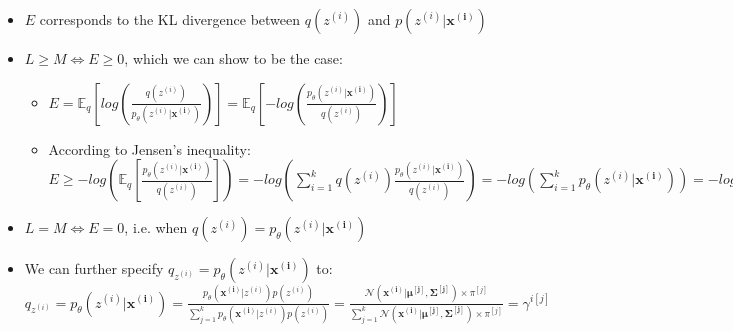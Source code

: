 \begin{itemize}
    Proof 1:
    \begin{itemize}
        \item $\sum_{i=1}^n \sum_{z^{(i)}} q(z^{(i)}) \log \frac{p_\theta( \boldsymbol{x^{(i)}}, z^{(i)})}{q(z^{(i)})} = \sum_{i=1}^n \sum_{z^{(i)}} p_\theta( z^{(i)} |\boldsymbol{x^{(i)}}) \log \frac{p_\theta( \boldsymbol{x^{(i)}}, z^{(i)})}{p_\theta( z^{(i)} |\boldsymbol{x^{(i)}})} = \sum_{i=1}^n \sum_{z^{(i)}} p_\theta( z^{(i)} |\boldsymbol{x^{(i)}}) \log \frac{p_\theta( \boldsymbol{x^{(i)}}) p_\theta( z^{(i)} |\boldsymbol{x^{(i)}})}{p_\theta( z^{(i)} |\boldsymbol{x^{(i)}})} = \sum_{i=1}^n \sum_{z^{(i)}} p_\theta( z^{(i)} |\boldsymbol{x^{(i)}}) \log p_\theta( \boldsymbol{x^{(i)}}) = \sum_{i=1}^n \times 1 \times \log p_\theta( \boldsymbol{x^{(i)}}) = L$
    \end{itemize}
    Proof 2:
    \begin{itemize}
        \item $L = \mathbb{E}_q[log(p_{\theta}(\boldsymbol{x^{(i)}}))] = \mathbb{E}_q[log(\frac{ p_{\theta}(\boldsymbol{x^{(i)}}, z^{(i)}) }{ p_{\theta}(z^{(i)} | \boldsymbol{x^{(i)}}) } \frac{ q(z^{(i)}) }{ q(z^{(i)}) } )] = \mathbb{E}_q[ log( \frac{ p_{\theta}(\boldsymbol{x^{(i)}}, z^{(i)}) } { q(z^{(i)}) } ) ] + \mathbb{E}_q[ log(\frac{ q(z^{(i)}) }{ p_{\theta}(z^{(i)} | \boldsymbol{x^{(i)}}) }) ] = M + E$
    \end{itemize}
    \item $E$ corresponds to the KL divergence between $q(z^{(i)})$ and $p( z^{(i)} | \boldsymbol{x^{(i)}} )$
    \item $L \geq M \Leftrightarrow E \geq 0$, which we can show to be the case: 
    \begin{itemize}
        \item $E = \mathbb{E}_q[ log(\frac{ q(z^{(i)}) }{ p_{\theta}(z^{(i)} | \boldsymbol{x^{(i)}}) }) ] = \mathbb{E}_q[ -log(\frac{ p_{\theta}(z^{(i)} | \boldsymbol{x^{(i)}}) }{ q(z^{(i)}) }) ]$
        \item According to Jensen's inequality: $E \geq -log(\mathbb{E}_q[\frac{ p_{\theta}(z^{(i)} | \boldsymbol{x^{(i)}}) }{ q(z^{(i)}) }]) = -log(\sum_{i=1}^k q(z^{(i)}) \frac{ p_{\theta}(z^{(i)} | \boldsymbol{x^{(i)}}) }{ q(z^{(i)}) }) = -log(\sum_{i=1}^k p_{\theta}(z^{(i)} | \boldsymbol{x^{(i)}})) = -log(1) = 0$
    \end{itemize}
    \item $L = M \Leftrightarrow E = 0$, i.e. when $q(z^{(i)}) = p_\theta( z^{(i)} | \boldsymbol{x^{(i)}})$
    \item We can further specify $q_{z^{(i)}} = p_\theta( z^{(i)} |\boldsymbol{x^{(i)}})$ to: $q_{z^{(i)}} = p_\theta( z^{(i)} |\boldsymbol{x^{(i)}}) = \frac{ p_\theta( \boldsymbol{x^{(i)}} | z^{(i)}) p( z^{(i)}) }{ \sum_{j=1}^k p_\theta( \boldsymbol{x^{(i)}} | z^{(i)}) p( z^{(i)}) } = \frac{ \mathcal{N}(\boldsymbol{x^{(i)}} | \boldsymbol{\mu^{[j]}}, \boldsymbol{\Sigma^{[j]}}) \times \pi^{[j]} } { \sum_{j=1}^k \mathcal{N}(\boldsymbol{x^{(i)}} | \boldsymbol{\mu^{[j]}}, \boldsymbol{\Sigma^{[j]}}) \times \pi^{[j]} } = \gamma^{i[j]}$
\end{itemize}

